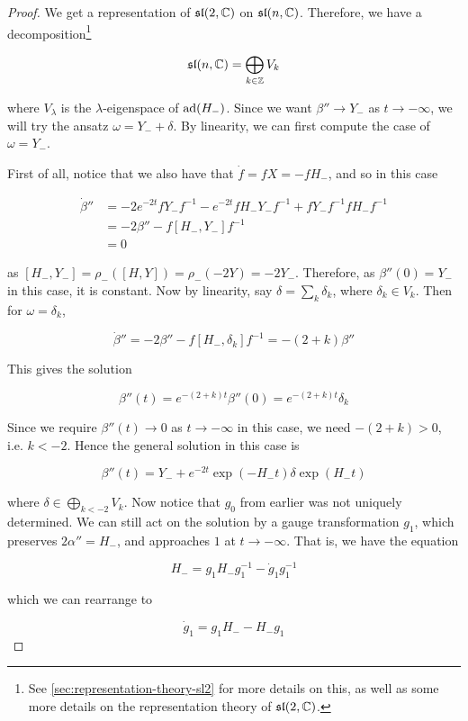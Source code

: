 \documentclass{report}
\renewcommand{\sl}{\mathfrak{sl}}
\begin{document}
\begin{proof}
    We get a representation of \(\sl(2, \C)\) on \(\sl(n, \C)\). Therefore, we have a decomposition\footnote{See \cref{sec:representation-theory-sl2} for more details on this, as well as some more details on the representation theory of \(\sl(2, \C)\).}

    \[\sl(n, \C) = \bigoplus_{k \in \Z}V_k\]

    where \(V_\lambda\) is the \(\lambda\)-eigenspace of \(\operatorname{ad}(H_-)\). Since we want \(\beta'' \to Y_-\) as \(t \to -\infty\), we will try the ansatz \(\omega = Y_- + \delta\). By linearity, we can first compute the case of \(\omega = Y_-\).

    First of all, notice that we also have that \(\dot f = f X = -fH_-\), and so in this case

    \begin{align*}
        \dot\beta'' &= -2e^{-2t}f Y_- f^{-1} - e^{-2t}f H_- Y_- f^{-1} + fY_-f^{-1}fH_-f^{-1} \\
        &= -2\beta'' - f[H_-, Y_-]f^{-1} \\
        &= 0
    \end{align*}

    as \([H_-, Y_-] = \rho_-([H, Y]) = \rho_-(-2Y) = -2Y_-\). Therefore, as \(\beta''(0) = Y_-\) in this case, it is constant. Now by linearity, say \(\delta = \sum_k \delta_k\), where \(\delta_k \in V_k\). Then for \(\omega = \delta_k\),

    \[\dot\beta'' = -2\beta'' - f[H_-, \delta_k]f^{-1} = -(2+k)\beta''\]

    This gives the solution

    \[\beta''(t) = e^{-(2+k)t}\beta''(0) = e^{-(2+k)t}\delta_k\]

    Since we require \(\beta''(t) \to 0\) as \(t \to -\infty\) in this case, we need \(-(2+k) > 0\), i.e. \(k < -2\). Hence the general solution in this case is

    \[\beta''(t) = Y_- + e^{-2t}\exp(-H_-t)\delta\exp(H_-t)\]

    where \(\delta \in \bigoplus\limits_{k < -2}V_k\). Now notice that \(g_0\) from earlier was not uniquely determined. We can still act on the solution by a gauge transformation \(g_1\), which preserves \(2\alpha'' = H_-\), and approaches \(1\) at \(t \to -\infty\). That is, we have the equation

    \[H_- = g_1H_-g_1^{-1} - \dot g_1 g_1^{-1}\]

    which we can rearrange to

    \[\dot g_1 = g_1H_- - H_- g_1\]


\end{proof}
\end{document}
